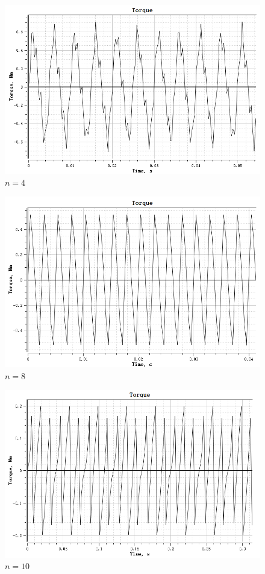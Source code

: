 \documentclass{thuemp}
\begin{document}
\begin{figure}[H]
  \centering
  \includegraphics[width=1\linewidth]{./img/task3/torque-n4.png}
  \caption{$n=4$}
\end{figure}
\begin{figure}[H]
  \centering
  \includegraphics[width=1\linewidth]{./img/task3/torque-n8.png}
  \caption{$n=8$}
\end{figure}
\begin{figure}[H]
  \centering
  \includegraphics[width=1\linewidth]{./img/task3/torque-n10.png}
  \caption{$n=10$}
\end{figure}
\end{document}
